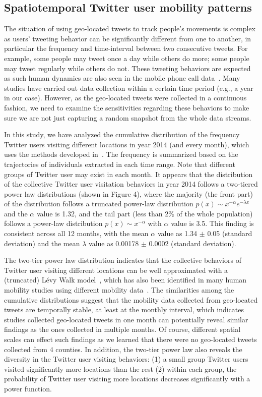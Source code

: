 \documentclass[a4paper, 11pt]{article}
\begin{document}
\subsection{Spatiotemporal Twitter user mobility patterns}
The situation of using geo-located tweets to track people's movements is complex as users' tweeting behavior can be significantly different from one to another, in particular the frequency and time-interval between two consecutive tweets. For example, some people may tweet once a day while others do more; some people may tweet regularly while others do not.  
These tweeting behaviors are expected as such human dynamics are also seen in the mobile phone call data~\citep{gonzalez2008understanding}. 
Many studies have carried out data collection within a certain time period (e.g., a year in our case).
However, as the geo-located tweets were collected in a continuous fashion, we need to examine the sensitivities regarding these behaviors to make sure we are not just capturing a random snapshot from the whole data streams. 

In this study, we have analyzed the cumulative distribution of the frequency Twitter users visiting different locations in year 2014 (and every month), which uses the methods developed in~\citep{clauset2009power}. 
The frequency is summarized based on the trajectories of individuals extracted in each time range. Note that different groups of Twitter user may exist in each month. 
It appears that the distribution of the collective Twitter user visitation behaviors in year 2014 follows a two-tiered power law distributions (shown in Figure 4), where the majority (the front part) of the distribution follows a truncated power-law distribution $p(x)\sim x^{-\alpha}e^{-\lambda x}$ and the $\alpha$ value is 1.32, and the tail part (less than 2$\%$ of the whole population) follows a power-law distribution  $p(x)\sim x^{-\alpha}$ with $\alpha$ value is 3.5.
This finding is consistent across all 12 months, with the mean $\alpha$ value as 1.34 $ \pm$  0.05 (standard deviation) and the mean $\lambda$ value as 0.00178 $ \pm$  0.0002 (standard deviation). 

The two-tier power law distribution indicates that the collective behaviors of Twitter user visiting different locations can be well approximated with a (truncated) L\'{e}vy Walk model~\citep{ reynolds2012truncated, rhee2011levy}, which has also been identified in many human mobility studies using different mobility data~\citep{zhao2015explaining}.
The similarities among the cumulative distributions suggest that the mobility data collected from geo-located tweets are temporally stable, at least at the monthly interval, which indicates studies collected geo-located tweets in one month can potentially reveal similar findings as the ones collected in multiple months. 
Of course, different spatial scales can effect such findings as we learned that there were no geo-located tweets collected from 4 counties.
In addition, the two-tier power law also reveals the diversity in the Twitter user visiting behaviors: (1) a small group Twitter users visited significantly more locations than the rest (2) within each group, the probability of Twitter user visiting more locations decreases significantly with a power function.
\end{document}
